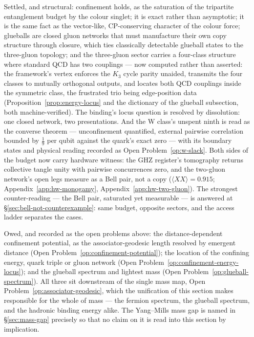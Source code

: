 Settled, and structural: confinement holds, as the saturation of the tripartite entanglement budget
by the colour singlet; it is exact rather than asymptotic; it is the same fact as the vector-like,
CP-conserving character of the colour force; glueballs are closed gluon networks that must manufacture
their own copy structure through closure, which ties classically detectable glueball states to the
three-gluon topology; and the three-gluon sector carries a four-class structure where standard QCD has
two couplings --- now computed rather than asserted: the framework's vertex enforces the $K_3$
cycle parity unaided, transmits the four classes to mutually orthogonal outputs, and locates both
QCD couplings inside the symmetric class, the frustrated trio being edge-position data
(Proposition~\ref{prop:energy-locus} and the dictionary of the glueball subsection, both
machine-verified). The binding's locus question is resolved by dissolution: one closed network, two
presentations. And the W class's unspent ninth is read as the converse
theorem --- unconfinement quantified, external pairwise correlation bounded by $\tfrac19$ per
qubit against the quark's exact zero --- with its boundary states and physical reading recorded as
Open Problem~\ref{op:w-slack}. Both sides of the budget now carry hardware witness: the GHZ register's
tomography returns collective tangle unity with pairwise concurrences zero, and the two-gluon
network's open legs measure as a Bell pair, not a copy ($\langle XX \rangle = 0.915$;
Appendix~\ref{app:hw-monogamy}, Appendix~\ref{app:hw-two-gluon}). The strongest counter-reading --- the Bell pair, saturated yet measurable ---
is answered at \S\ref{sec:bell-not-counterexample}: same budget, opposite sectors, and the access
ladder separates the cases.

Owed, and recorded as the open problems above: the distance-dependent confinement potential, as the
associator-geodesic length resolved by emergent distance (Open Problem~\ref{op:confinement-potential});
the location of the confining energy, quark triple or gluon network (Open
Problem~\ref{op:confinement-energy-locus}); and the glueball spectrum and lightest mass (Open
Problem~\ref{op:glueball-spectrum}). All three sit downstream of the single mass map, Open
Problem~\ref{op:associator-geodesic}, which the unification of this section makes responsible for the
whole of mass --- the fermion spectrum, the glueball spectrum, and the hadronic binding energy
alike. The Yang--Mills mass gap is named in \S\ref{sec:mass-gap} precisely so that no claim on it is
read into this section by implication.
